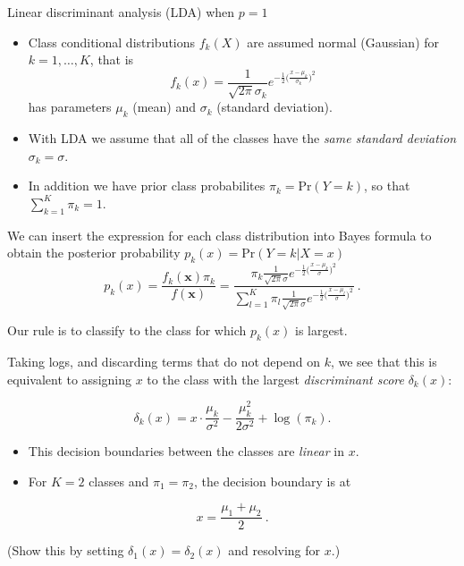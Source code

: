 \documentclass[10pt,ignorenonframetext,]{beamer}
\begin{document}
\begin{frame}{Linear discriminant analysis (LDA) when \(p=1\)}

\begin{itemize}
\item
  Class conditional distributions \(f_k(X)\) are assumed normal
  (Gaussian) for \(k=1,\ldots,K\), that is
  \[f_k(x) = \frac{1}{\sqrt{2\pi}\sigma_k} e^{-\frac{1}{2}\big(\frac{x-\mu_k}{\sigma_k}\big)^2} \]
  has parameters \(\mu_k\) (mean) and \(\sigma_k\) (standard deviation).
\item
  With LDA we assume that all of the classes have the \emph{same
  standard deviation} \(\sigma_k = \sigma\).
\item
  In addition we have prior class probabilites \(\pi_k=\text{Pr}(Y=k)\),
  so that \(\sum_{k=1}^K \pi_k=1\).
\end{itemize}

\end{frame}

\begin{frame}

We can insert the expression for each class distribution into Bayes
formula to obtain the posterior probability
\(p_k(x) = \text{Pr}(Y = k | X = x)\)
\[p_k(x) = \frac{f_k({\boldsymbol x}) \pi_k}{f({\boldsymbol x})}=\frac{\pi_k \frac{1}{\sqrt{2\pi}\sigma} e^{-\frac{1}{2}\big(\frac{x-\mu_k}{\sigma}\big)^2}}{\sum_{l=1}^K \pi_l \frac{1}{\sqrt{2\pi}\sigma} e^{-\frac{1}{2}\big(\frac{x-\mu_l}{\sigma}\big)^2}} \ .\]

Our rule is to classify to the class for which \(p_k(x)\) is largest.

\end{frame}

\begin{frame}

Taking logs, and discarding terms that do not depend on \(k\), we see
that this is equivalent to assigning \(x\) to the class with the largest
\emph{discriminant score} \(\delta_k(x)\):

\[\delta_k(x) = x\cdot \frac{\mu_k}{\sigma^2} - \frac{\mu_k^2}{2 \sigma^2}+\log(\pi_k).\]

\begin{itemize}
\item
  This decision boundaries between the classes are \emph{linear} in
  \(x\).
\item
  For \(K=2\) classes and \(\pi_1=\pi_2\), the decision boundary is at
\end{itemize}

\[x = \frac{\mu_1+ \mu_2}{2} \ .\]

(Show this by setting \(\delta_1(x)=\delta_2(x)\) and resolving for
\(x\).)

\end{frame}
\end{document}
